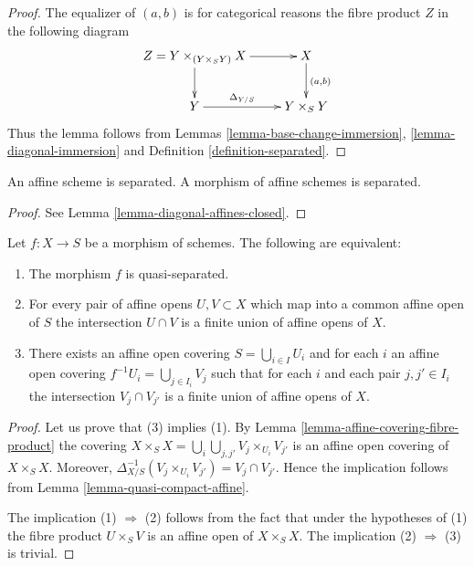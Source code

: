 \begin{proof}
The equalizer of $(a, b)$ is for categorical reasons
the fibre product $Z$ in the following diagram
$$
\xymatrix{
Z = Y \times_{(Y \times_S Y)} X \ar[r] \ar[d] &
 X \ar[d]^{(a , b)} \\
Y \ar[r]^-{\Delta_{Y/S}} & Y \times_S Y
}
$$
Thus the lemma follows from Lemmas
\ref{lemma-base-change-immersion}, \ref{lemma-diagonal-immersion} and
Definition \ref{definition-separated}.
\end{proof}

\begin{lemma}
\label{lemma-affine-separated}
An affine scheme is separated.
A morphism of affine schemes is separated.
\end{lemma}

\begin{proof}
See Lemma \ref{lemma-diagonal-affines-closed}.
\end{proof}

\begin{lemma}
\label{lemma-characterize-quasi-separated}
Let $f : X \to S$ be a morphism of schemes.
The following are equivalent:
\begin{enumerate}
\item The morphism $f$ is quasi-separated.
\item For every pair of affine opens $U, V \subset X$
which map into a common affine open of $S$ the intersection
$U \cap V$ is a finite union of affine opens of $X$.
\item There exists an affine open covering $S = \bigcup_{i \in I} U_i$
and for each $i$ an affine open covering $f^{-1}U_i = \bigcup_{j \in I_i} V_j$
such that for each $i$ and each pair $j, j' \in I_i$ the
intersection $V_j \cap V_{j'}$ is a finite union of affine
opens of $X$.
\end{enumerate}
\end{lemma}

\begin{proof}
Let us prove that (3) implies (1).
By Lemma \ref{lemma-affine-covering-fibre-product}
the covering $X \times_S X = \bigcup_i \bigcup_{j, j'} V_j \times_{U_i} V_{j'}$
is an affine open covering of $X \times_S X$.
Moreover, $\Delta_{X/S}^{-1}(V_j \times_{U_i} V_{j'}) = V_j \cap V_{j'}$.
Hence the implication follows from Lemma \ref{lemma-quasi-compact-affine}.

\medskip\noindent
The implication (1) $\Rightarrow$ (2) follows from the fact
that under the hypotheses of (1) the fibre product
$U \times_S V$ is an affine open of $X \times_S X$.
The implication (2) $\Rightarrow$ (3) is trivial.
\end{proof}

